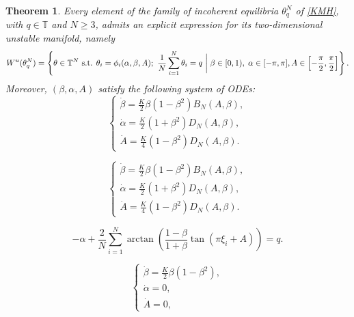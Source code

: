 \documentclass[10pt,a4paper]{amsart}
\newtheorem{theorem}{Theorem}
\newcommand{\T}{\mathbb{T}}
\renewcommand{\u}{\textnormal{u}}
\begin{document}
\begin{theorem}\label{main_theorem}
    Every element of the family of incoherent equilibria $\theta^N_q$ of \eqref{KMH}, with $q\in\mathbb{T}$ and $N\geq3$, admits an explicit expression for its two-dimensional unstable manifold, namely
    $$W^\u(\theta^N_q)=\left\{\theta\in\T^N\text{ s.t. } \theta_i=\phi_i(\alpha,\beta,A);\text{ }\frac{1}{N}\sum_{i=1}^N\theta_i=q\text{ }\bigg\vert\;\beta\in[0,1),\;\alpha\in[-\pi,\pi],A\in\left[-\frac{\pi}{2},\frac{\pi}{2}\right]\right\}.$$
    Moreover, $(\beta,\alpha,A)$ satisfy the following system of ODEs:
    \begin{equation}\label{3d-system}
    \begin{cases}
        \dot{\beta}=\frac{K}{2}\beta(1-\beta^2)B_N(A,\beta),\\
        \dot{\alpha}=\frac{K}{2}(1+\beta^2)D_N(A,\beta),\\
        \dot{A}=\frac{K}{4}(1-\beta^2)D_N(A,\beta).
    \end{cases}
    \end{equation}
\end{theorem}

    \begin{equation}
    \begin{cases}
        \dot{\beta}=\frac{K}{2}\beta(1-\beta^2)B_N(A,\beta),\\
        \dot{\alpha}=\frac{K}{2}(1+\beta^2)D_N(A,\beta),\\
        \dot{A}=\frac{K}{4}(1-\beta^2)D_N(A,\beta).
    \end{cases}
    \end{equation}

\begin{equation}\label{mean_phase_new}
    -\alpha+\frac{2}{N}\sum_{i=1}^N\arctan\left(\frac{1-\beta}{1+\beta}\tan\left(\pi\xi_i+A\right)\right)=q.
\end{equation}

\begin{equation}\label{limit_dyn}
    \begin{cases}
    \dot{\beta}=\frac{K}{2}\beta(1-\beta^2),\\
    \dot{\alpha}=0,\\
    \dot{A}=0,
\end{cases}
\end{equation}
\end{document}
